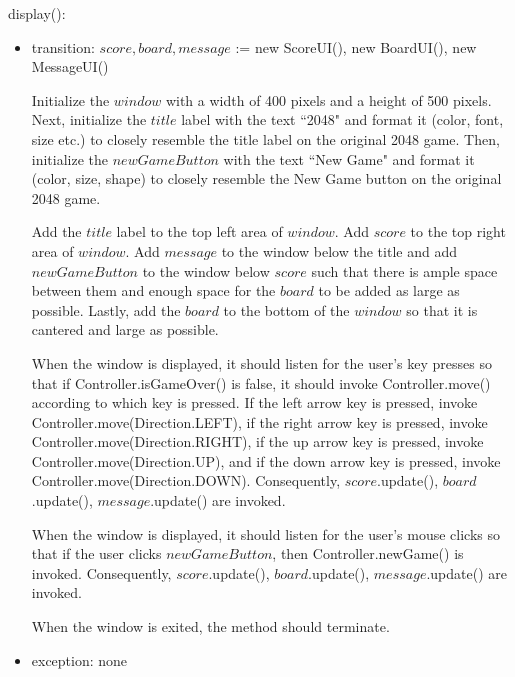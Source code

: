 \documentclass[12pt]{article}
\begin{document}
\noindent display():
\begin{itemize}
\item transition: $score, board, message$ := new ScoreUI(), new BoardUI(), new MessageUI() 

Initialize the $window$ with a width of 400 pixels and a height of 500 pixels. Next, initialize the $title$ label with the text ``2048" and format it (color, font, size etc.) to closely resemble the title label on the original 2048 game. Then, initialize the $newGameButton$ with the text ``New Game" and format it (color, size, shape) to closely resemble the New Game button on the original 2048 game.

Add the $title$ label to the top left area of $window$. Add $score$ to the top right area of $window$. Add $message$ to the window below the title and add $newGameButton$ to the window below $score$ such that there is ample space between them and enough space for the $board$ to be added as large as possible. Lastly, add the $board$ to the bottom of the $window$ so that it is cantered and large as possible.

When the window is displayed, it should listen for the user's key presses so that if Controller.isGameOver() is false, it should invoke Controller.move() according to which key is pressed. If the left arrow key is pressed, invoke Controller.move(Direction.LEFT), if the right arrow key is pressed, invoke Controller.move(Direction.RIGHT), if the up arrow key is pressed, invoke Controller.move(Direction.UP), and if the down arrow key is pressed, invoke Controller.move(Direction.DOWN). Consequently, $score$.update(), $board$.update(), $message$.update() are invoked. 

When the window is displayed, it should listen for the user's mouse clicks so that if the user clicks $newGameButton$, then Controller.newGame() is invoked. Consequently, $score$.update(), $board$.update(), $message$.update() are invoked. 

When the window is exited, the method should terminate.

\item exception: none
\end{itemize}
\end{document}
